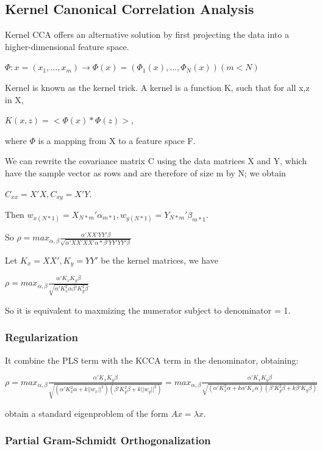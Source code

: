 \documentclass[a4paper]{article}
\begin{document}
\subsection{Kernel Canonical Correlation Analysis}
Kernel CCA offers an alternative solution by first projecting the data into a higher-dimensional feature space.

$\Phi: x = (x_1,...,x_m) \to \Phi(x) = (\Phi_1(x),...,\Phi_N(x)) (m<N)$

Kernel is known as the kernel trick. A kernel is a function K, such that for all x,z in X, 

$K(x,z) = <\Phi(x)*\Phi(z)>$,

where $\Phi$ is a mapping from X to a feature space F.

We can rewrite the covariance matrix C using the data matrices X and Y, which have the sample vector as rows and are therefore of size m by N; we obtain

$C_{xx} = X'X, C_{xy}=X'Y$.

Then $w_{x(N*1)} = X_{N*m}'\alpha_{m*1}, w_{y(N*1)}=Y_{N*m}'\beta_{m*1}$.

So $\rho = max_{\alpha,\beta} \frac{\alpha'XX'YY'\beta}{\sqrt{\alpha'XX'XX'\alpha * \beta'YY'YY'\beta}}$

Let $K_x = XX', K_y = YY'$ be the kernel matrices, we have

$\rho = max_{\alpha,\beta} \frac{\alpha'K_xK_y\beta}{\sqrt{\alpha'K_x^2\alpha \beta'K_y^2\beta}}$

So it is equivalent to maxmizing the numerator subject to denominator = 1.

\subsubsection{Regularization}
It combine the PLS term with the KCCA term in the denominator, obtaining:

$\rho = max_{\alpha,\beta} \frac{\alpha'K_xK_y\beta}{\sqrt{(\alpha'K_x^2\alpha+k||w_x||^2)(\beta'K^2_y\beta+k||w_y||^2)}}
=max_{\alpha,\beta} \frac{\alpha'K_xK_y\beta}{\sqrt{(\alpha'K_x^2\alpha+k\alpha'K_x\alpha)(\beta'K^2_y\beta+k\beta'K_y\beta)}}$

obtain a standard eigenproblem of the form $Ax=\lambda x$.

\subsubsection{Partial Gram-Schmidt Orthogonalization}
\end{document}
